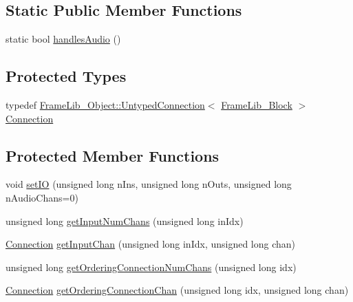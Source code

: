 \subsection*{Static Public Member Functions}
\begin{DoxyCompactItemize}
\item 
static bool \hyperlink{class_frame_lib___multi_channel_a2995ef0ba184b2d8a1c44b74f5f39876}{handles\+Audio} ()
\end{DoxyCompactItemize}
\subsection*{Protected Types}
\begin{DoxyCompactItemize}
\item 
typedef \hyperlink{struct_frame_lib___object_1_1_untyped_connection}{Frame\+Lib\+\_\+\+Object\+::\+Untyped\+Connection}$<$ \hyperlink{class_frame_lib___block}{Frame\+Lib\+\_\+\+Block} $>$ \hyperlink{class_frame_lib___multi_channel_ae58a3f32378b88e31fd9da76206c7313}{Connection}
\end{DoxyCompactItemize}
\subsection*{Protected Member Functions}
\begin{DoxyCompactItemize}
\item 
void \hyperlink{class_frame_lib___multi_channel_aa602f450561447330df32fe73167244b}{set\+IO} (unsigned long n\+Ins, unsigned long n\+Outs, unsigned long n\+Audio\+Chans=0)
\item 
unsigned long \hyperlink{class_frame_lib___multi_channel_a8ba357b72ac5103d936e7416384294e0}{get\+Input\+Num\+Chans} (unsigned long in\+Idx)
\item 
\hyperlink{class_frame_lib___multi_channel_ae58a3f32378b88e31fd9da76206c7313}{Connection} \hyperlink{class_frame_lib___multi_channel_aa23b173b4bea788c2c348a34c29efebc}{get\+Input\+Chan} (unsigned long in\+Idx, unsigned long chan)
\item 
unsigned long \hyperlink{class_frame_lib___multi_channel_a04fc2468a6e61cefa7579d0d470b2a6e}{get\+Ordering\+Connection\+Num\+Chans} (unsigned long idx)
\item 
\hyperlink{class_frame_lib___multi_channel_ae58a3f32378b88e31fd9da76206c7313}{Connection} \hyperlink{class_frame_lib___multi_channel_ab2d63ddcd522f31102519ba04204b554}{get\+Ordering\+Connection\+Chan} (unsigned long idx, unsigned long chan)
\end{DoxyCompactItemize}
